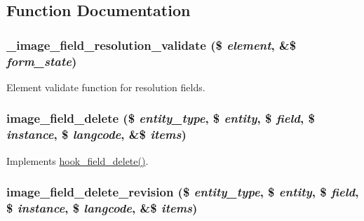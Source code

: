 \subsection{Function Documentation}
\hypertarget{image_8field_8inc_af4577f26176adb7633adb3b2dd8749c2}{
\subsubsection[{\_\-image\_\-field\_\-resolution\_\-validate}]{\setlength{\rightskip}{0pt plus 5cm}\_\-image\_\-field\_\-resolution\_\-validate (\$ {\em element}, \/  \&\$ {\em form\_\-state})}}
\label{image_8field_8inc_af4577f26176adb7633adb3b2dd8749c2}
Element validate function for resolution fields. \hypertarget{image_8field_8inc_ac1fc99b6479859cd10477476064285f2}{
\subsubsection[{image\_\-field\_\-delete}]{\setlength{\rightskip}{0pt plus 5cm}image\_\-field\_\-delete (\$ {\em entity\_\-type}, \/  \$ {\em entity}, \/  \$ {\em field}, \/  \$ {\em instance}, \/  \$ {\em langcode}, \/  \&\$ {\em items})}}
\label{image_8field_8inc_ac1fc99b6479859cd10477476064285f2}
Implements \hyperlink{group__field__types_gaf1e5787044b83d34cf7daed3d5297336}{hook\_\-field\_\-delete()}. \hypertarget{image_8field_8inc_a460a161a4443c74ca50c53a75c7136a4}{
\subsubsection[{image\_\-field\_\-delete\_\-revision}]{\setlength{\rightskip}{0pt plus 5cm}image\_\-field\_\-delete\_\-revision (\$ {\em entity\_\-type}, \/  \$ {\em entity}, \/  \$ {\em field}, \/  \$ {\em instance}, \/  \$ {\em langcode}, \/  \&\$ {\em items})}}
\label{image_8field_8inc_a460a161a4443c74ca50c53a75c7136a4}
